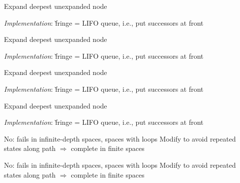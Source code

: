 \documentclass{article}
\begin{document}
\begin{huge}

Expand deepest unexpanded node

\emph{Implementation}:\nl
\v{fringe} = LIFO queue, i.e., put successors at front

\textwidth
{}



Expand deepest unexpanded node

\emph{Implementation}:\nl
\v{fringe} = LIFO queue, i.e., put successors at front

\textwidth
{}



Expand deepest unexpanded node

\emph{Implementation}:\nl
\v{fringe} = LIFO queue, i.e., put successors at front

\textwidth
{}



Expand deepest unexpanded node

\emph{Implementation}:\nl
\v{fringe} = LIFO queue, i.e., put successors at front

\textwidth
{}





 No: fails in infinite-depth spaces, spaces with loops\nl
Modify to avoid repeated states along path\nnl
$\Rightarrow$ complete in finite spaces



 No: fails in infinite-depth spaces, spaces with loops\nl
Modify to avoid repeated states along path\nnl
$\Rightarrow$ complete in finite spaces


\end{huge}
\end{document}
